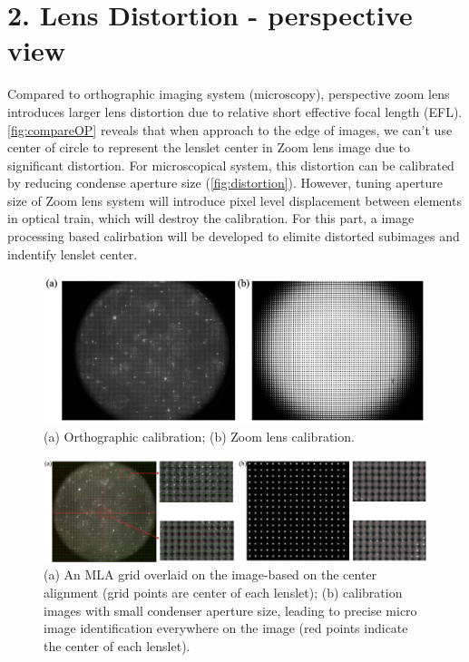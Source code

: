 \documentclass[draftthesis,fullpage]{uiucthesis}
\begin{document}
\section*{2. Lens Distortion - perspective view}
Compared to orthographic imaging system (microscopy), perspective zoom lens introduces larger lens distortion due to relative short effective focal length (EFL). \autoref{fig:compareOP} reveals that when approach to the edge of images, we can't use center of circle to represent the lenslet center in Zoom lens image due to significant distortion. For microscopical system, this distortion can be calibrated by reducing condense aperture size (\autoref{fig:distortion}). However, tuning aperture size of Zoom lens system will introduce pixel level displacement between elements in optical train, which will destroy the calibration. For this part, a image processing based calirbation will be developed to elimite distorted subimages and indentify lenslet center. 

\begin{figure}[h]
  \centerline{\includegraphics[width = 0.9\linewidth]{fig/CompareOP.png}} 
  \caption{(a) Orthographic calibration; (b) Zoom lens calibration. }
\label{fig:compareOP}
\end{figure}
\begin{figure}[h]
  \centerline{\includegraphics[width=1\linewidth]{fig/figure7.jpg}} 
  \caption{(a) An MLA grid overlaid on the image-based on the center alignment (grid points are center of each lenslet); (b) calibration images with small condenser aperture size, leading to precise micro image identification everywhere on the image (red points indicate the center of each lenslet).}
\label{fig:distortion}
\end{figure}
\end{document}
